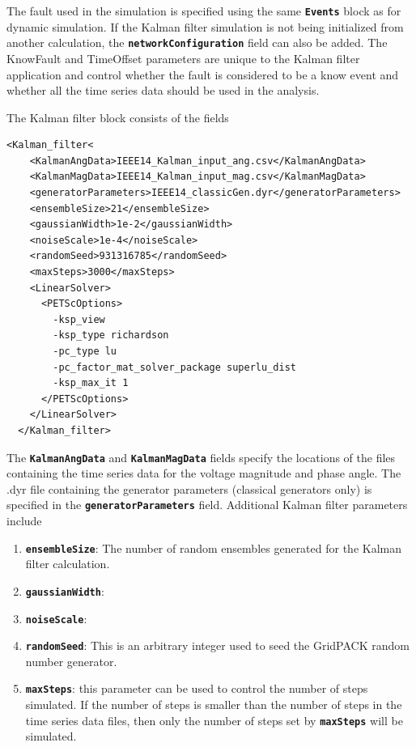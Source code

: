 The fault used in the simulation is specified using the same \texttt{\textbf{Events}} block as for dynamic simulation. If the Kalman filter simulation is not being initialized from another calculation, the \texttt{\textbf{networkConfiguration}} field can also be added. The KnowFault and TimeOffset parameters are unique to the Kalman filter application and control whether the fault is considered to be a know event and whether all the time series data should be used in the analysis.

The Kalman filter block consists of the fields

{
\color{blue}
\begin{Verbatim}[fontseries=b]
  <Kalman_filter<
    <KalmanAngData>IEEE14_Kalman_input_ang.csv</KalmanAngData>
    <KalmanMagData>IEEE14_Kalman_input_mag.csv</KalmanMagData>
    <generatorParameters>IEEE14_classicGen.dyr</generatorParameters>
    <ensembleSize>21</ensembleSize>
    <gaussianWidth>1e-2</gaussianWidth>
    <noiseScale>1e-4</noiseScale>
    <randomSeed>931316785</randomSeed>
    <maxSteps>3000</maxSteps>
    <LinearSolver>
      <PETScOptions>
        -ksp_view
        -ksp_type richardson
        -pc_type lu
        -pc_factor_mat_solver_package superlu_dist
        -ksp_max_it 1
      </PETScOptions>
    </LinearSolver>
  </Kalman_filter>
\end{Verbatim}
}

The \texttt{\textbf{KalmanAngData}} and \texttt{\textbf{KalmanMagData}} fields specify the locations of the files containing the time series data for the voltage magnitude and phase angle. The .dyr file containing the generator parameters (classical generators only) is specified in the \texttt{\textbf{generatorParameters}} field. Additional Kalman filter parameters include

\begin{enumerate}
\item  \texttt{\textbf{ensembleSize}}: The number of random ensembles generated for the Kalman filter calculation.

\item  \texttt{\textbf{gaussianWidth}}: 

\item  \texttt{\textbf{noiseScale}}:

\item  \texttt{\textbf{randomSeed}}: This is an arbitrary integer used to seed the GridPACK random number generator.

\item  \texttt{\textbf{maxSteps}}: this parameter can be used to control the number of steps simulated. If the number of steps is smaller than the number of steps in the time series data files, then only the number of steps set by \texttt{\textbf{maxSteps}} will be simulated.
\end{enumerate}

